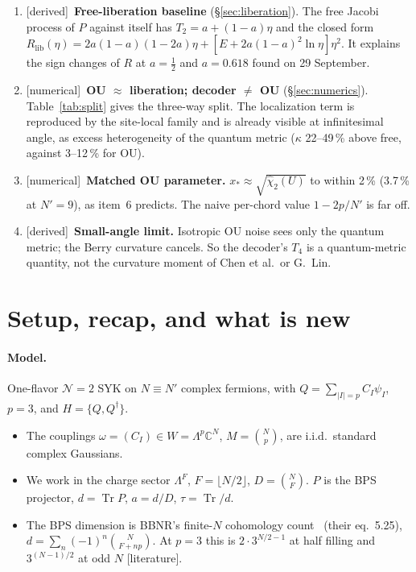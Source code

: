 \documentclass[11pt]{article}
\newcommand{\Tr}{\operatorname{Tr}}
\newcommand{\Np}{N'}
\newcommand{\lib}{\mathrm{lib}}
\newcommand{\tagbox}[2]{\textsf{\small\color{#1}[#2]}}
\newcommand{\EST}{\tagbox{cest}{literature}}
\newcommand{\DER}{\tagbox{cder}{derived}}
\newcommand{\NUM}{\tagbox{cnum}{numerical}}
\theoremstyle{remark}
\begin{document}
\begin{enumerate}
  family $K_J=z^{[i\in J]}$. The four-arc rule (adjacent-arc chords $K_J$, opposite-arc chords 1) is the 29 September
  $\mathbb Z_2$ rule. It is \emph{not} the random-matter rule of BINT (opposite chords $\tilde q^{\,2}$). The decoder
  equals OU at $x_s$ exactly when cross-chord index sets are uncorrelated, which holds in double scaling for heavy probes.
\item \DER\ \textbf{Free-liberation baseline} (\S\ref{sec:liberation}). The free Jacobi process of $P$ against itself has
  $T_2=a+(1-a)\eta$ and the closed form
  $R_\lib(\eta)=2a(1-a)(1-2a)\eta+[E+2a(1-a)^2\ln\eta]\eta^2$. It explains the sign changes of $R$ at $a=\tfrac12$
  and $a=0.618$ found on 29 September.
\item \NUM\ \textbf{OU $\approx$ liberation; decoder $\neq$ OU} (\S\ref{sec:numerics}). Table~\ref{tab:split} gives the
  three-way split. The localization term is reproduced by the site-local family and is already visible at infinitesimal
  angle, as excess heterogeneity of the quantum metric ($\kappa$ 22--49\,\% above free, against 3--12\,\% for OU).
\item \NUM\ \textbf{Matched OU parameter.} $x_*\approx\sqrt{\hat\chi_2(U)}$ to within 2\,\% (3.7\,\% at $\Np=9$), as
  item~6 predicts. The naive per-chord value $1-2p/\Np$ is far off.
\item \DER\ \textbf{Small-angle limit.} Isotropic OU noise sees only the quantum metric; the Berry curvature cancels.
  So the decoder's $T_4$ is a quantum-metric quantity, not the curvature moment of Chen et al.\ or G.~Lin.
\end{enumerate}

\section{Setup, recap, and what is new}\label{sec:setup}
\paragraph{Model.} One-flavor $\mathcal N{=}2$ SYK on $N\equiv\Np$ complex fermions, with $Q=\sum_{|I|=p}C_I\psi_I$, $p=3$,
and $H=\{Q,Q^\dagger\}$.
\begin{itemize}\itemsep1pt
\item The couplings $\omega=(C_I)\in W=\Lambda^p\mathbb C^N$, $M=\binom Np$, are i.i.d.\ standard complex Gaussians.
\item We work in the charge sector $\Lambda^F$, $F=\lfloor N/2\rfloor$, $D=\binom NF$. $P$ is the BPS projector,
  $d=\Tr P$, $a=d/D$, $\tau=\Tr/d$.
\item The BPS dimension is BBNR's finite-$N$ cohomology count~\cite{BBNR} (their eq.~5.25),
  $d=\sum_n(-1)^n\binom N{F+np}$. At $p=3$ this is $2\cdot3^{N/2-1}$ at half filling and $3^{(N-1)/2}$ at odd $N$
  \EST.
\end{itemize}
\end{document}
